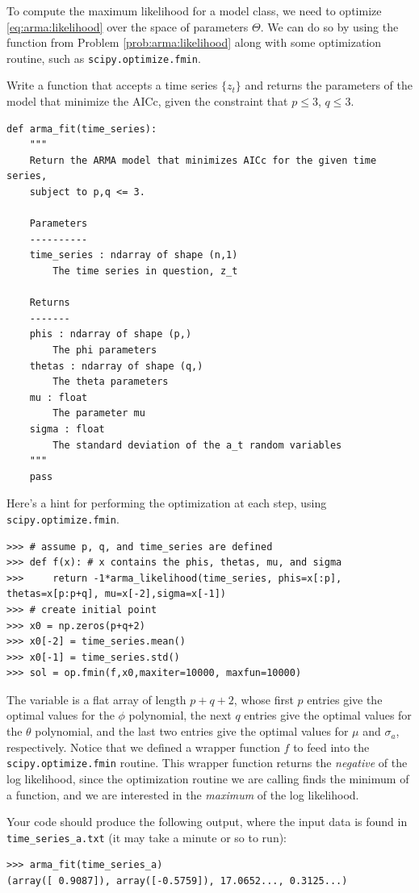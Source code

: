 To compute the maximum likelihood for a model class, we need to optimize
\ref{eq:arma:likelihood} over the space of parameters $\Theta$. We can do so
by using the function from Problem \ref{prob:arma:likelihood} along with some
optimization routine, such as {\tt scipy.optimize.fmin}.

\begin{problem}
\label{prob:arma:mle}
Write a function that accepts a time series $\{z_t\}$ and returns the
parameters of the model that minimize the AICc, given the constraint that $p
\leq 3$, $q \leq 3$.

\begin{lstlisting}
def arma_fit(time_series):
    """
    Return the ARMA model that minimizes AICc for the given time series,
    subject to p,q <= 3.

    Parameters
    ----------
    time_series : ndarray of shape (n,1)
        The time series in question, z_t

    Returns
    -------
    phis : ndarray of shape (p,)
        The phi parameters
    thetas : ndarray of shape (q,)
        The theta parameters
    mu : float
        The parameter mu
    sigma : float
        The standard deviation of the a_t random variables
    """
    pass
\end{lstlisting}
\vspace{3mm} \noindent
Here's a hint for performing the optimization at each step, using\\ {\tt scipy.optimize.fmin}.
\begin{lstlisting}
>>> # assume p, q, and time_series are defined
>>> def f(x): # x contains the phis, thetas, mu, and sigma
>>>     return -1*arma_likelihood(time_series, phis=x[:p], thetas=x[p:p+q], mu=x[-2],sigma=x[-1])
>>> # create initial point
>>> x0 = np.zeros(p+q+2)
>>> x0[-2] = time_series.mean()
>>> x0[-1] = time_series.std()
>>> sol = op.fmin(f,x0,maxiter=10000, maxfun=10000)
\end{lstlisting}
\vspace{3mm} \noindent
The variable  is a flat array of length $p+q+2$, whose first $p$ entries give the optimal values
for the $\phi$ polynomial, the next $q$ entries give the optimal values for the $\theta$ polynomial,
and the last two entries give the optimal values for $\mu$ and $\sigma_a$, respectively.
Notice that we defined a wrapper function $f$ to feed into the {\tt scipy.optimize.fmin} routine.
This wrapper function returns the \emph{negative} of the log likelihood, since the optimization routine we are
calling finds the minimum of a function, and we are interested in the \emph{maximum} of the log likelihood.

Your code should produce the following output, where the input data is found in
{\tt time\_series\_a.txt} (it may take a minute or so to run):
\begin{lstlisting}
>>> arma_fit(time_series_a)
(array([ 0.9087]), array([-0.5759]), 17.0652..., 0.3125...)
\end{lstlisting}
\end{problem}

